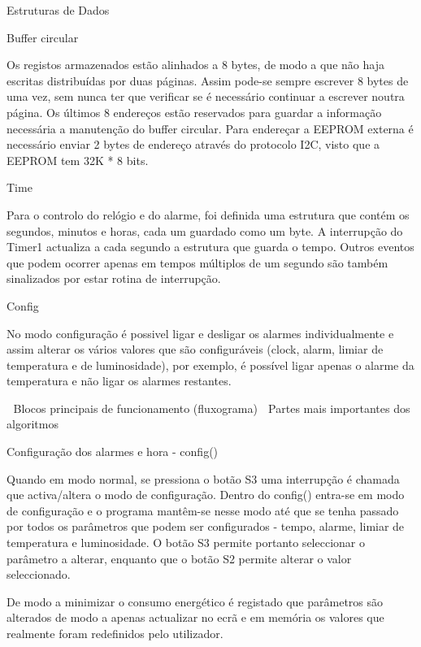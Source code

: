 \documentclass[a4paper,12pt]{article}
\begin{document}
	

	\tableofcontents
	\pagebreak




Estruturas de Dados

Buffer circular

Os registos armazenados estão alinhados a 8 bytes, de modo a que não haja escritas distribuídas por duas páginas. Assim pode-se sempre escrever 8 bytes de uma vez, sem nunca ter que verificar se é necessário continuar a escrever noutra página. Os últimos 8 endereços estão reservados para guardar a informação necessária a manutenção do buffer circular. Para endereçar a EEPROM externa é necessário enviar 2 bytes de endereço através do protocolo I2C, visto que a EEPROM tem 32K * 8 bits.

Time

Para o controlo do relógio e do alarme, foi definida uma estrutura que contém os segundos, minutos e horas, cada um guardado como um byte. A interrupção do Timer1 actualiza a cada segundo a estrutura que guarda o tempo. Outros eventos que podem ocorrer apenas em tempos múltiplos de um segundo são também sinalizados por estar rotina de interrupção.

Config

No modo configuração é possivel ligar e desligar os alarmes individualmente e assim alterar os vários valores que são configuráveis (clock, alarm, limiar de temperatura e de luminosidade), por exemplo, é possível ligar apenas o alarme da temperatura e não ligar os alarmes restantes.


Blocos principais de funcionamento (fluxograma)

Partes mais importantes dos algoritmos

Configuração dos alarmes e hora - config()


Quando em modo normal, se pressiona o botão S3 uma interrupção é chamada que activa/altera o modo de configuração. Dentro do config() entra-se em modo de configuração e o programa mantêm-se nesse modo até que se tenha passado por todos os parâmetros que podem ser configurados - tempo, alarme, limiar de temperatura e luminosidade. O botão S3 permite portanto seleccionar o parâmetro a alterar, enquanto que o botão S2 permite alterar o valor seleccionado.

De modo a minimizar o consumo energético é registado que parâmetros são alterados de modo a apenas actualizar no ecrã e em memória os valores que realmente foram redefinidos pelo utilizador.
\end{document}
